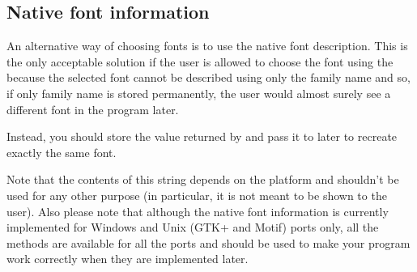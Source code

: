 \subsection{Native font information}

An alternative way of choosing fonts is to use the native font description.
This is the only acceptable solution if the user is allowed to choose the font
using the  because the selected font cannot
be described using only the family name and so, if only family name is stored
permanently, the user would almost surely see a different font in the program
later.

Instead, you should store the value returned by 
 and pass
it to  later to
recreate exactly the same font.

Note that the contents of this string depends on the platform and shouldn't be
used for any other purpose (in particular, it is not meant to be shown to the
user). Also please note that although the native font information is currently
implemented for Windows and Unix (GTK+ and Motif) ports only, all the methods
are available for all the ports and should be used to make your program work
correctly when they are implemented later.

